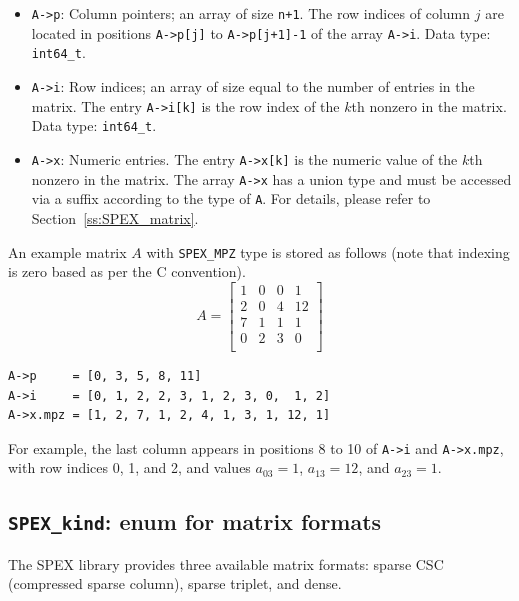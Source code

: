 \documentclass[12pt,oneside]{book}
\theoremstyle{definition}
\begin{document}
\begin{itemize}
    \item \verb|A->p|: Column pointers; an array of size \verb|n+1|. The row indices of column $j$ are located in positions \verb|A->p[j]| to \verb|A->p[j+1]-1| of the array \verb|A->i|. Data type: \verb|int64_t|.

    \item \verb|A->i|: Row indices; an array of size equal to the number of entries in the matrix. The entry \verb|A->i[k]| is the row index of the $k$th nonzero in the matrix. Data type: \verb|int64_t|.

    \item \verb|A->x|: Numeric entries. The entry \verb|A->x[k]| is the numeric value of the $k$th nonzero in the matrix.  The array \verb|A->x| has a union type and must be accessed via a suffix according to the type of \verb|A|.  For details, please refer to Section~\ref{ss:SPEX_matrix}.
\end{itemize}

An example matrix $A$ with \verb|SPEX_MPZ| type is stored as follows (note that indexing is zero based as per the C convention).
\[A = \begin{bmatrix}
    1 & 0 & 0 & 1 \\
    2 & 0 & 4 & 12 \\
    7 & 1 & 1 & 1 \\
    0 & 2 & 3 & 0 \\
\end{bmatrix}\]

\begin{verbatim}
A->p     = [0, 3, 5, 8, 11]
A->i     = [0, 1, 2, 2, 3, 1, 2, 3, 0,  1, 2]
A->x.mpz = [1, 2, 7, 1, 2, 4, 1, 3, 1, 12, 1]
\end{verbatim}

For example, the last column appears in positions 8 to 10 of \verb|A->i| and \verb|A->x.mpz|, with row indices 0, 1, and 2, and values $a_{03}=1$, $a_{13}=12$, and $a_{23}=1$.


\subsection{\texttt{SPEX\_kind}: enum for matrix formats} \label{ss:SPEX_kind}
The SPEX library provides three available matrix formats: sparse CSC
(compressed sparse column), sparse triplet, and dense.
\end{document}
